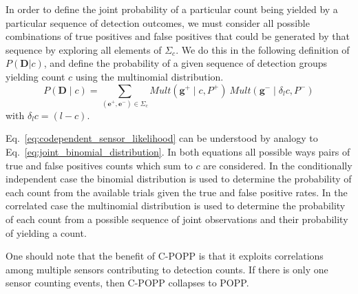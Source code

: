 In order to define the joint probability of a particular count being yielded by a particular sequence of detection outcomes, we must consider all possible combinations of true positives and false positives that could be generated by that sequence by exploring all elements of $\Sigma_c$. We do this in the following definition of $P(\mathbf{D} | c)$, and define the probability of a given sequence of detection groups yielding count $c$ using the multinomial distribution.
\begin{equation}
\label{eq:codependent_sensor_likelihood}
P(\mathbf{D} \mid c) = \sum\limits_{(\mathbf{e}^+, \mathbf{e}^-) \in \Sigma_c} Mult(\mathbf{g}^+ \mid c, P^+) ~ Mult(\mathbf{g}^- \mid \delta_l c, P^-)
\end{equation}
\noindent with $\delta_l c = (l - c)$.

Eq.~\ref{eq:codependent_sensor_likelihood} can be understood by analogy to Eq.~\ref{eq:joint_binomial_distribution}. In both equations all possible ways pairs of true and false positives counts which sum to $c$ are considered. In the conditionally independent case the binomial distribution is used to determine the probability of each count from the available trials given the true and false positive rates. In the correlated case the multinomial distribution is used to determine the probability of each count from a possible sequence of joint observations and their probability of yielding a count.

One should note that the benefit of C-POPP is that it exploits correlations among multiple sensors contributing to detection counts. If there is only one sensor counting events, then C-POPP collapses to POPP.


